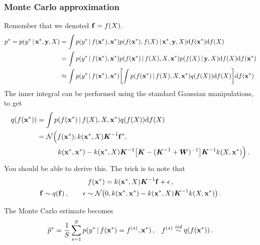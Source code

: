 \documentclass[a4paper]{article}
\newcommand{\mat}[1]{{\boldsymbol{{#1}}}} %
\theoremstyle{definition}
\begin{document}
\subsubsection{Monte Carlo approximation}
Remember that we denoted $\mathbf{f} = f(X)$.
\begin{align}
p^* = p(y^*\given \vx^*, \vy, X) &= \int p(y^*\given f(\vx^*), \vx^*) p(f(\vx^*), f(X)\given \vx^*, \vy, X) \calcd{f(\vx^*)} \calcd{f(X)} \\
&=\int p(y^*\given f(\vx^*), \vx^*) p(f(\vx^*)\given f(X), X, \vx^*) p(f(X)\given \vy, X)  \calcd{f(X)} \calcd{f(\vx^*)} \\
&\approx \int p(y^*\given f(\vx^*), \vx^*) \left[\int p(f(\vx^*)\given f(X), X, \vx^*) q(f(X))  \calcd{f(X)} \right] \calcd{f(\vx^*)}
\end{align}
The inner integral can be performed using the standard Gaussian manipulations, to get
\begin{align}
q(f(\vx^*)) &= \int p(f(\vx^*)\given f(X), X, \vx^*) q(f(X))  \calcd{f(X)} \\
&= \mathcal N \Big(f(\vx^*); k(\vx^*, X)\mat K\inv\vf^*, \\
& \quad \qquad k(\vx^*,\vx^*) - k(\vx^*, X)\mat K\inv\left[\mat K - (\mat K\inv + \mat W)\inv\right]\mat K\inv k(X, \vx^*)\Big) \,.
\end{align}
You should be able to derive this. The trick is to note that
\begin{gather}
f(\vx^*) = k(\vx^*, X)\mat K\inv\vf + \epsilon \,, \\
\vf \sim q(\vf) \,, \qquad \epsilon \sim \NormDist{0, k(\vx^*, \vx^*) - k(\vx^*, X)\mat K\inv k(X, \vx^*)} \,.
\end{gather}

The Monte Carlo estimate becomes
\begin{align}
\hat p^* = \frac{1}{S}\sum_{s=1}^S p(y^*\,|\, f(\mathbf{x}^*) = f^{(s)}, \mathbf{x}^*) \,,  && f^{(s)} \overset{iid}{\sim} q(f(\mathbf{x}^*)) \,.
\end{align}
\end{document}
